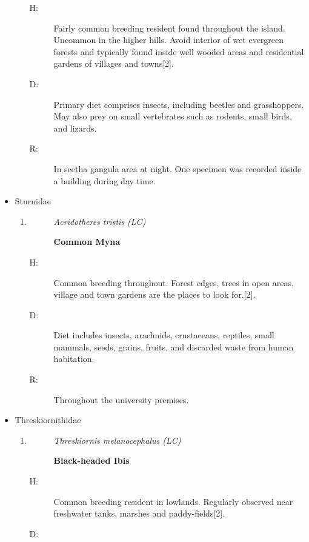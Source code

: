 \begin{itemize}
\begin{enumerate}
\begin{description}%
\item[H: ]%
Fairly common breeding resident found throughout the island. Uncommon in the higher hills. Avoid interior of wet evergreen forests and typically found inside well wooded areas and residential gardens of villages and towns{[}2{]}.%
\item[D: ]%
Primary diet comprises insects, including beetles and grasshoppers. May also prey on small vertebrates such as rodents, small birds, and lizards.%
\item[R: ]%
In seetha gangula area at night. One specimen was recorded inside a building during day time.%
\end{description}%
\end{enumerate}%
\item%
Sturnidae%
\begin{enumerate}%
\item%
\begin{description}%
\item[]%
\textit{Acridotheres tristis (LC)}%
\item[]%
\textbf{Common Myna}%
\end{description}%
\begin{description}%
\item[H: ]%
Common breeding throughout. Forest edges, trees in open areas, village and town gardens are the places to look for.{[}2{]}.%
\item[D: ]%
Diet includes insects, arachnids, crustaceans, reptiles, small mammals, seeds, grains, fruits, and discarded waste from human habitation.%
\item[R: ]%
Throughout the university premises.%
\end{description}%
\end{enumerate}%
\item%
Threskiornithidae%
\begin{enumerate}%
\item%
\begin{description}%
\item[]%
\textit{Threskiornis melanocephalus (LC)}%
\item[]%
\textbf{Black{-}headed Ibis}%
\end{description}%
\begin{description}%
\item[H: ]%
Common breeding resident in lowlands. Regularly observed near freshwater tanks, marshes and paddy-fields{[}2{]}.%
\item[D: ]%

\end{description}
\end{enumerate}
\end{itemize}
